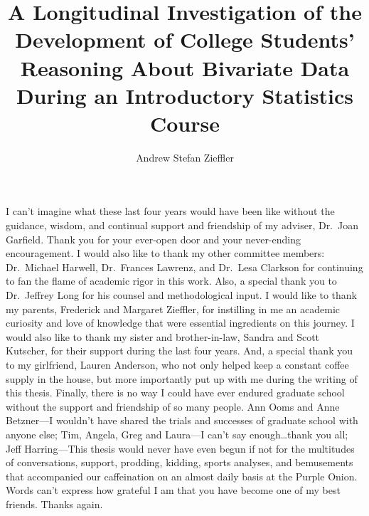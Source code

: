 \documentclass[11pt]{umnthesis}
\title{A Longitudinal Investigation of the Development of College Students' Reasoning About Bivariate Data During an Introductory Statistics Course}
\author{Andrew Stefan Zieffler}
\begin{document}
\frenchspacing %



\makesignaturepage %
\maketitlepage %
\makecopyrightpage %



\frontmatter
\pagestyle{empty} %



  \begin{acknowledgements}
    I can't imagine what these last four years would have been like without the guidance, wisdom, and continual support and friendship of my adviser, Dr.~Joan Garfield. Thank you for your ever-open door and your never-ending encouragement. I would also like to thank my other committee members: Dr.~Michael Harwell, Dr.~Frances Lawrenz, and Dr.~Lesa Clarkson for continuing to fan the flame of academic rigor in this work. Also, a special thank you to Dr.~Jeffrey Long for his counsel and methodological input.
    I would like to thank my parents, Frederick and Margaret Zieffler, for instilling in me an academic curiosity and love of knowledge that were essential ingredients on this journey. I would also like to thank my sister and brother-in-law, Sandra and Scott Kutscher, for their support during the last four years. And, a special thank you to my girlfriend, Lauren Anderson, who not only helped keep a constant coffee supply in the house, but more importantly put up with me during the writing of this thesis.
    Finally, there is no way I could have ever endured graduate school without the support and friendship of so many people. Ann Ooms and Anne Betzner---I wouldn't have shared the trials and successes of graduate school with anyone else; Tim, Angela, Greg and Laura---I can't say enough\ldots thank you all; Jeff Harring---This thesis would never have even begun if not for the multitudes of conversations, support, prodding, kidding, sports analyses, and bemusements that accompanied our caffeination on an almost daily basis at the Purple Onion. Words can't express how grateful I am that you have become one of my best friends. Thanks again.
  \end{acknowledgements}


\end{document}
